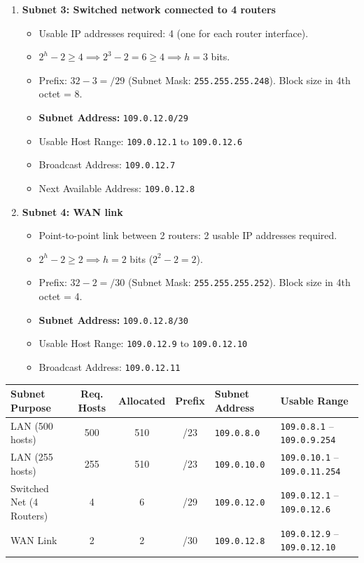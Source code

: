 \documentclass[11pt,a4paper]{article}
\begin{document}
\begin{enumerate}
    \item \textbf{Subnet 3: Switched network connected to 4 routers}
    \begin{itemize}
        \item Usable IP addresses required: 4 (one for each router interface).
        \item $2^h - 2 \ge 4 \implies 2^3 - 2 = 6 \ge 4 \implies h = 3$ bits.
        \item Prefix: $32 - 3 = /29$ (Subnet Mask: \texttt{255.255.255.248}). Block size in 4th octet = 8.
        \item \textbf{Subnet Address:} \texttt{109.0.12.0/29}
        \item Usable Host Range: \texttt{109.0.12.1} to \texttt{109.0.12.6}
        \item Broadcast Address: \texttt{109.0.12.7}
        \item Next Available Address: \texttt{109.0.12.8}
    \end{itemize}

    \item \textbf{Subnet 4: WAN link}
    \begin{itemize}
        \item Point-to-point link between 2 routers: 2 usable IP addresses required.
        \item $2^h - 2 \ge 2 \implies h = 2$ bits ($2^2 - 2 = 2$).
        \item Prefix: $32 - 2 = /30$ (Subnet Mask: \texttt{255.255.255.252}). Block size in 4th octet = 4.
        \item \textbf{Subnet Address:} \texttt{109.0.12.8/30}
        \item Usable Host Range: \texttt{109.0.12.9} to \texttt{109.0.12.10}
        \item Broadcast Address: \texttt{109.0.12.11}
    \end{itemize}
\end{enumerate}

\begin{center}
\begin{tabular}{|l|c|c|c|l|l|}
\hline
\textbf{Subnet Purpose} & \textbf{Req. Hosts} & \textbf{Allocated} & \textbf{Prefix} & \textbf{Subnet Address} & \textbf{Usable Range} \\
\hline
LAN (500 hosts) & 500 & 510 & /23 & \texttt{109.0.8.0} & \texttt{109.0.8.1} -- \texttt{109.0.9.254} \\
LAN (255 hosts) & 255 & 510 & /23 & \texttt{109.0.10.0} & \texttt{109.0.10.1} -- \texttt{109.0.11.254} \\
Switched Net (4 Routers) & 4 & 6 & /29 & \texttt{109.0.12.0} & \texttt{109.0.12.1} -- \texttt{109.0.12.6} \\
WAN Link & 2 & 2 & /30 & \texttt{109.0.12.8} & \texttt{109.0.12.9} -- \texttt{109.0.12.10} \\
\hline
\end{tabular}
\end{center}
\end{document}
